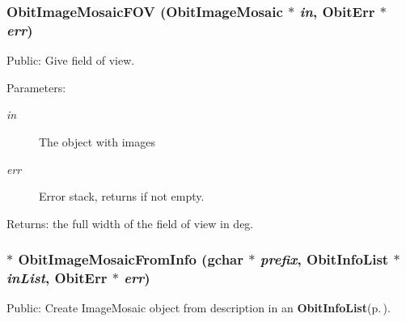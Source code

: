 \subsubsection{ Obit\-Image\-Mosaic\-FOV ({\bf Obit\-Image\-Mosaic} $\ast$ {\em in}, {\bf Obit\-Err} $\ast$ {\em err})}\label{ObitImageMosaic_8c_a26}


Public: Give field of view. 

\begin{Desc}
\item[Parameters:]
\begin{description}
\item[{\em in}]The object with images \item[{\em err}]Error stack, returns if not empty. \end{description}
\end{Desc}
\begin{Desc}
\item[Returns:]the full width of the field of view in deg. \end{Desc}
\subsubsection{$\ast$ Obit\-Image\-Mosaic\-From\-Info (gchar $\ast$ {\em prefix}, {\bf Obit\-Info\-List} $\ast$ {\em in\-List}, {\bf Obit\-Err} $\ast$ {\em err})}\label{ObitImageMosaic_8c_a12}


Public: Create Image\-Mosaic object from description in an {\bf Obit\-Info\-List}{\rm (p.\,\pageref{structObitInfoList})}. 

